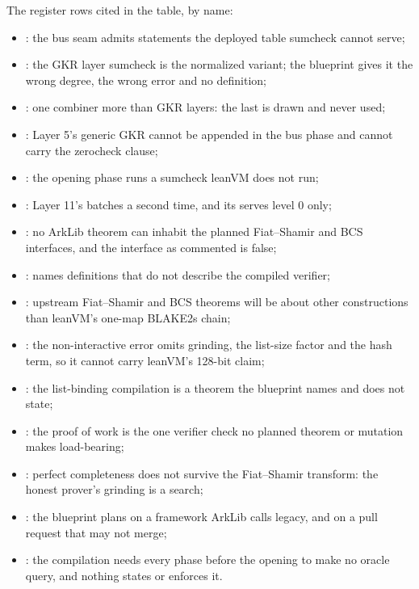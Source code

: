 The register rows cited in the table, by name:
\begin{itemize}
\item {}: the bus seam admits statements the deployed table sumcheck cannot serve;
\item {}: the GKR layer sumcheck is the normalized variant; the blueprint gives it the
  wrong degree, the wrong error and no definition;
\item {}: one combiner more than GKR layers: the last is drawn and never used;
\item {}: Layer 5's generic GKR cannot be appended in the bus phase and cannot carry the
  zerocheck clause;
\item {}: the opening phase runs a sumcheck leanVM does not run;
\item {}: Layer 11's  batches a second time, and its  serves
  level 0 only;
\item {}: no ArkLib theorem can inhabit the planned Fiat--Shamir and BCS interfaces, and
  the interface as commented is false;
\item {}:  names definitions that do not describe the compiled
  verifier;
\item {}: upstream Fiat--Shamir and BCS theorems will be about other constructions than
  leanVM's one-map BLAKE2s chain;
\item {}: the non-interactive error omits grinding, the list-size factor and the hash
  term, so it cannot carry leanVM's 128-bit claim;
\item {}: the list-binding compilation is a theorem the blueprint names and does not
  state;
\item {}: the proof of work is the one verifier check no planned theorem or mutation
  makes load-bearing;
\item {}: perfect completeness does not survive the Fiat--Shamir transform: the honest
  prover's grinding is a search;
\item {}: the blueprint plans on a framework ArkLib calls legacy, and on a pull request
  that may not merge;
\item {}: the compilation needs every phase before the opening to make no oracle query,
  and nothing states or enforces it.
\end{itemize}

